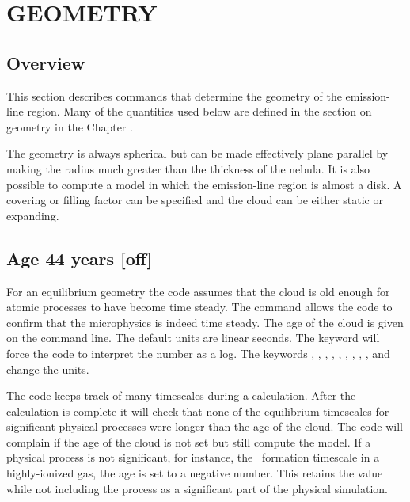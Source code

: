 \chapter{GEOMETRY}

\section{Overview}

This section describes commands that determine the geometry of the
emission-line region.
Many of the quantities used below are defined in
the section on geometry in the Chapter .

The geometry is always spherical but can be made effectively plane
parallel by making the radius much greater than the
thickness of the nebula.
It is also possible to compute a model in which the emission-line region
is almost a disk.
A covering or filling factor can be specified and the
cloud can be either static or expanding.

\section{Age 44 years [off]}
\label{sec:AgeCommand}

For an equilibrium geometry the code assumes that the cloud is old enough for
atomic processes to have become time steady.
The  command allows the
code to confirm that the microphysics is indeed time steady.
The age of
the cloud is given on the command line.
The default units are linear
seconds.
The keyword  will force the code to interpret the number as
a log.
The keywords , , ,
, , ,
, , , and
 change the units.

The code keeps track of many timescales during a calculation.
After the calculation is complete it will check that none of the
equilibrium timescales for significant physical processes
were longer than the age of the cloud.
The code will complain if the age of the cloud is not set but
still compute the model.
If a physical process is not significant, for
instance, the \htwo\ formation timescale in a highly-ionized gas,
the age is
set to a negative number.
This retains the value while not including the
process as a significant part of the physical simulation.

